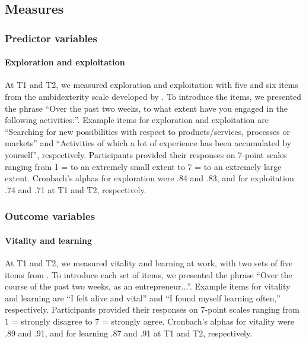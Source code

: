 \documentclass[man]{apa7}
\begin{document}
\subsection{Measures}
\subsubsection{Predictor variables}
\paragraph{Exploration and exploitation}
At T1 and T2, we measured exploration and exploitation with five and six items from the ambidexterity scale developed by \textcite{Mom.2007}. 
To introduce the items, we presented the phrase “Over the past two weeks, to what extent have you engaged in the following activities:”.
Example items for exploration and exploitation are “Searching for new possibilities with respect to products/services, processes or markets” and “Activities of which a lot of experience has been accumulated by yourself”, respectively. Participants provided their responses on 7-point scales ranging from 1 = to an extremely small extent to 7 = to an extremely large extent.
Cronbach’s alphas for exploration were .84 and .83, and for exploitation .74 and .71 at T1 and T2, respectively.

\subsubsection{Outcome variables}
\paragraph{Vitality and learning}
At T1 and T2, we measured vitality and learning at work, with two sets of five items from \textcite{Porath.2012}.
To introduce each set of items, we presented the phrase “Over the course of the past two weeks, as an entrepreneur...”. 
Example items for vitality and learning are “I felt alive and vital” and “I found myself learning often,” respectively. 
Participants provided their responses on 7-point scales ranging from 1 = strongly disagree to 7 = strongly agree.
Cronbach’s alphas for vitality were .89 and .91, and for learning .87 and .91 at T1 and T2, respectively.
\end{document}
